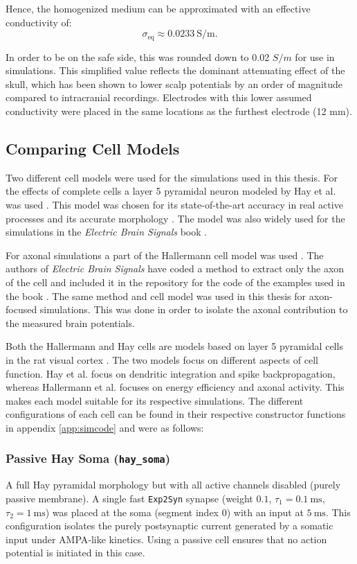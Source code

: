 \documentclass[final, a4paper,masters,en,listoffigures,listoftables,norwegiandates]{NMBU}
\begin{document}
Hence, the homogenized medium can be approximated with an effective conductivity of:
\begin{equation}
    \boxed{ \sigma_{\text{eq}} \approx 0.0233\ \text{S/m} }.
\end{equation}

In order to be on the safe side, this was rounded down to 0.02 $S/m$ for use in simulations. This simplified value reflects the dominant attenuating effect of the skull, which has been shown to lower scalp potentials by an order of magnitude compared to intracranial recordings. Electrodes with this lower assumed conductivity were placed in the same locations as the furthest electrode (12 mm). 

\subsection{Comparing Cell Models}\label{subsec:cellmodels}
Two different cell models were used for the simulations used in this thesis. For the effects of complete cells a layer 5 pyramidal neuron modeled by Hay et al. was used \cite{Hay2011}. This model was chosen for its state-of-the-art accuracy in real active processes and its accurate morphology \cite{ness2016subthreshold}. The model was also widely used for the simulations in the \textit{Electric Brain Signals} book \cite{Halnes2024ElectricBrainSignals}.

For axonal simulations a part of the Hallermann cell model was used \cite{Hallermann2012}. The authors of \textit{Electric Brain Signals} have coded a method to extract only the axon of the cell and included it in the repository for the code of the examples used in the book \cite{Hagen_ElectricBrainSignals_repo}. The same method and cell model was used in this thesis for axon-focused simulations. This was done in order to isolate the axonal contribution to the measured brain potentials. 

Both the Hallermann and Hay cells are models based on layer 5 pyramidal cells in the rat visual cortex \cite{Hallermann2012, Hay2011}. The two models focus on different aspects of cell function. Hay et al. focus on dendritic integration and spike backpropagation, whereas Hallermann et al. focuses on energy efficiency and axonal activity. This makes each model suitable for its respective simulations. The different configurations of each cell can be found in their respective constructor functions in appendix \ref{app:simcode} and were as follows:

\subsubsection{Passive Hay Soma (\texttt{hay\_soma})}
\label{sec:passive_hay_soma}
A full Hay pyramidal morphology but with all active channels disabled (purely passive membrane). A single fast \texttt{Exp2Syn} synapse (weight \(0.1\), \(\tau_1 = 0.1\ \mathrm{ms}\), \(\tau_2 = 1\ \mathrm{ms}\)) was placed at the soma (segment index 0) with an input at \(5\ \mathrm{ms}\). This configuration isolates the purely postsynaptic current generated by a somatic input under AMPA‐like kinetics. Using a passive cell ensures that no action potential is initiated in this case.
\end{document}
